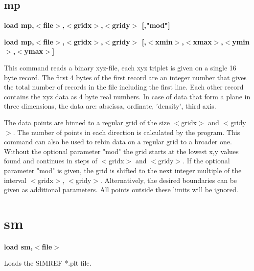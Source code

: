\subsection*{mp}
{\bf load mp,$ <$file$> $,$ <$gridx$> $,$ <$gridy$> $ [,"mod"] \par }
{\bf load mp,$ <$file$> $,$ <$gridx$> $,$ <$gridy$> $ [,$ <$xmin$> $,$ <$xmax$> $,$ <$ymin$> $,$ <$ymax$> $] \par }
\par
\vspace{3pt}
This command reads a binary xyz-file, each xyz triplet is given on a 
single 16 byte record. The first 4 bytes of the first record are 
an integer number that gives the total number of records in the file 
including the first line. Each other record contains the xyz data 
as 4 byte real numbers. In case of data that form a plane in three 
dimensions, the data are: abscissa, ordinate, 'density', third axis. 
\par
The data points are binned to a regular grid of the size $ <$gridx$> $ 
and $ <$gridy$> $. The number of points in each direction is calculated 
by the program. This command can also be used to rebin data on 
a regular grid to a broader one. 
Without the optional parameter "mod" the grid starts at the lowest 
x,y values found and continues in steps of $ <$gridx$> $ and $ <$gridy$> $. 
If the optional parameter "mod" is given, the grid is shifted 
to the next integer multiple of the interval $ <$gridx$> $, $ <$gridy$> $. 
Alternatively, the desired boundaries can be given as additional 
parameters. All points outside these limits will be ignored. 
\section{sm}
{\bf load sm,$ <$file$> $ \par }
\par
\vspace{3pt}
Loads the SIMREF *.plt file. 
